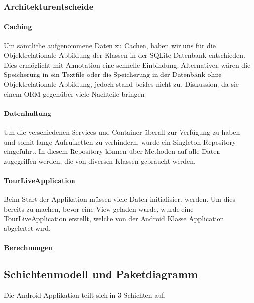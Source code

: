 \subsubsection{Architekturentscheide}

\paragraph{Caching}
Um sämtliche aufgenommene Daten zu Cachen, haben wir uns für die Objektrelationale Abbildung der Klassen in der SQLite Datenbank entschieden. Dies ermöglicht mit Annotation eine schnelle Einbindung. Alternativen wären die Speicherung in ein Textfile oder die Speicherung in der Datenbank ohne Objektrelationale Abbildung, jedoch stand beides nicht zur Diskussion, da sie einem ORM gegenüber viele Nachteile bringen.

\paragraph{Datenhaltung}
Um die verschiedenen Services und Container überall zur Verfügung zu haben und somit lange Aufrufketten zu verhindern, wurde ein Singleton Repository eingeführt. In diesem Repository können über Methoden auf alle Daten zugegriffen werden, die von diversen Klassen gebraucht werden.

\paragraph{TourLiveApplication}
Beim Start der Applikation müssen viele Daten initialisiert werden. Um dies bereits zu machen, bevor eine View geladen wurde, wurde eine TourLiveApplication erstellt, welche von der Android Klasse Application abgeleitet wird. 

\paragraph{Berechnungen}

\subsection{Schichtenmodell und Paketdiagramm}
Die Android Applikation teilt sich in 3 Schichten auf.

